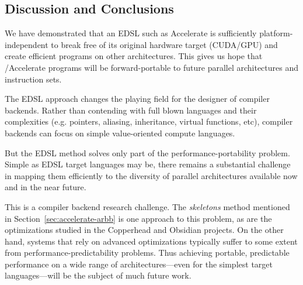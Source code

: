 
\subsection{Discussion and Conclusions}

We have demonstrated that an EDSL such as Accelerate is sufficiently
platform-independent to break free of its original hardware target
(CUDA/GPU) and create efficient programs on other architectures.  This
gives us hope that \systemname{}/Accelerate programs will be
forward-portable to future parallel architectures and instruction
sets.

The EDSL approach changes the playing field for the designer
of compiler backends.  Rather than contending with full blown
languages and their complexities (e.g. pointers, aliasing,
inheritance, virtual functions, etc), compiler backends can focus on
simple value-oriented compute languages.


But the EDSL method solves only part of the performance-portability problem.
Simple as EDSL target languages may be, there remains a
substantial challenge in mapping them efficiently to the diversity
of parallel architectures available now and in the near future.

This is a compiler backend research challenge.
The {\em skeletons} method mentioned in
Section~\ref{sec:accelerate-arbb} is one approach to this problem, as
are the optimizations studied in the Copperhead  and
Obsidian  projects.
%
On the other hand, systems that rely on advanced optimizations
typically suffer to some extent from performance-predictability
problems.  Thus achieving portable, predictable performance on a wide range
of architectures---even for the simplest target languages---will
be the subject of much future work.

{}


%


